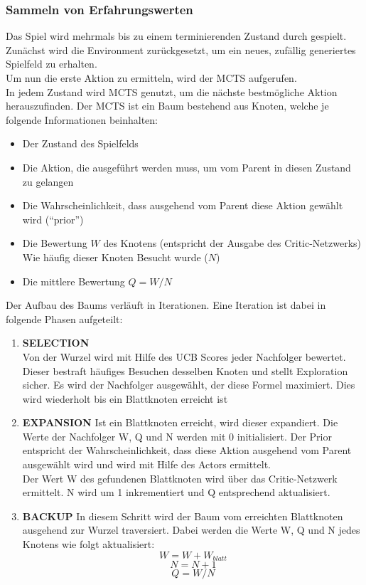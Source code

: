 \subsubsection*{Sammeln von Erfahrungswerten}
Das Spiel wird mehrmals bis zu einem terminierenden Zustand durch gespielt.
\\
Zunächst wird die Environment zurückgesetzt, um ein neues, zufällig generiertes Spielfeld zu erhalten.
\\
Um nun die erste Aktion zu ermitteln, wird der MCTS aufgerufen. 
\\
In jedem Zustand wird MCTS genutzt, um die nächste bestmögliche Aktion herauszufinden. Der MCTS ist ein Baum bestehend aus Knoten, welche je folgende Informationen beinhalten:
\begin{itemize}
	\item Der Zustand des Spielfelds
	\item Die Aktion, die ausgeführt werden muss, um vom Parent in diesen Zustand zu gelangen
	\item Die Wahrscheinlichkeit, dass ausgehend vom Parent diese Aktion gewählt wird (“prior”)
	\item Die Bewertung $W$ des Knotens (entspricht der Ausgabe des Critic-Netzwerks)
	Wie häufig dieser Knoten Besucht wurde ($N$)
	
	\item Die mittlere Bewertung $Q = W / N$
\end{itemize}
Der Aufbau des Baums verläuft in Iterationen. Eine Iteration ist dabei in folgende Phasen aufgeteilt:
\begin{enumerate}
	\item \textbf{SELECTION}\\ 
	Von der Wurzel wird mit Hilfe des UCB Scores jeder Nachfolger bewertet. Dieser bestraft häufiges Besuchen desselben Knoten und stellt Exploration sicher. Es wird der Nachfolger ausgewählt, der diese Formel maximiert. Dies wird wiederholt bis ein Blattknoten erreicht ist
	\item \textbf{EXPANSION}
	Ist ein Blattknoten erreicht, wird dieser expandiert. Die Werte der Nachfolger W, Q und N werden mit 0 initialisiert. Der Prior entspricht der Wahrscheinlichkeit, dass diese Aktion ausgehend vom Parent ausgewählt wird und wird mit Hilfe des Actors ermittelt.\\
	Der Wert W des gefundenen Blattknoten wird über das Critic-Netzwerk ermittelt. N wird um 1 inkrementiert und Q entsprechend aktualisiert.
	\item \textbf{BACKUP}
	In diesem Schritt wird der Baum vom erreichten Blattknoten ausgehend zur Wurzel traversiert. Dabei werden die Werte W, Q und N jedes Knotens wie folgt aktualisiert:
	\begin{equation}W = W + W_{blatt}\end{equation}
	\begin{equation}N = N + 1\end{equation}
	\begin{equation}Q = W / N\end{equation}
\end{enumerate}
